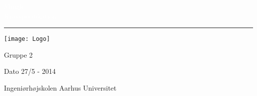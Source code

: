 \thispagestyle{empty} %

\BgThispage
{}
\vspace*{2cm}
\noindent
\textcolor{white}{\bigsf Mingle \\ Kravspecifikation}
\vspace*{2.5cm}\par
\noindent
\begin{minipage}{0.45\linewidth}
    \begin{flushright}
        \printauthor
    \end{flushright}
\end{minipage} \hspace{30pt}
%
\begin{minipage}{0.02\linewidth}
    \rule{1pt}{275pt}
\end{minipage} \hspace{-10pt}
%
\begin{minipage}{0.6\linewidth}
\vspace{5pt}
 

\texttt{[image: Logo]}
  
Gruppe 2 \newline

Dato 27/5 - 2014 \newline

Ingeniørhøjskolen Aarhus Universitet \newline



\end{minipage}
\restoregeometry